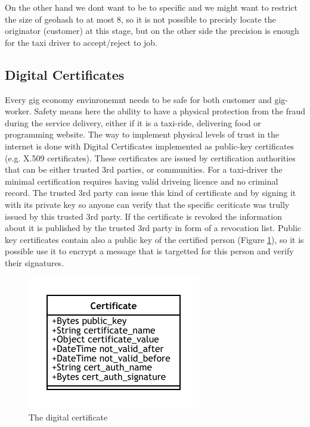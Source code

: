 \documentclass{article}
\begin{document}
On the other hand we dont want to be to specific and we might want to restrict the size of geohash to at most 8, so it is not possible to precisly locate the originator (customer) at this stage, but on the other side the precision is enough for the taxi driver to accept/reject to job.

\subsection{Digital Certificates}

Every gig economy envinronemnt needs to be safe for both customer and gig-worker. Safety means here the ability to have a physical protection from the fraud during the service delivery, either if it is a taxi-ride, delivering food or programming website. The way to implement physical levels of trust in the internet is done with Digital Certificates implemented as public-key certificates (e.g. X.509 certificates). These certificates are issued by certification authorities that can be either trusted 3rd parties, or communities. For a taxi-driver the minimal certification requires having valid driveing licence and no criminal record. The trusted 3rd party can issue this kind of certificate and by signing it with its private key so anyone can verify that the specific ceriticate was trully issued by this trusted 3rd party. If the certificate is revoked the information about it is published by the trusted 3rd party in form of a revocation list. Public key certificates contain also a public key of the certified person (Figure \ref{fig:fr:certificate}), so it is possible use it to encrypt a message that is targetted for this person and verify their signatures.

\begin{figure}
	\centering
	\includegraphics[scale=1.0]{Certificate.pdf}
	\caption{The digital certificate}
	\label{fig:fr:certificate}
\end{figure}
\end{document}
